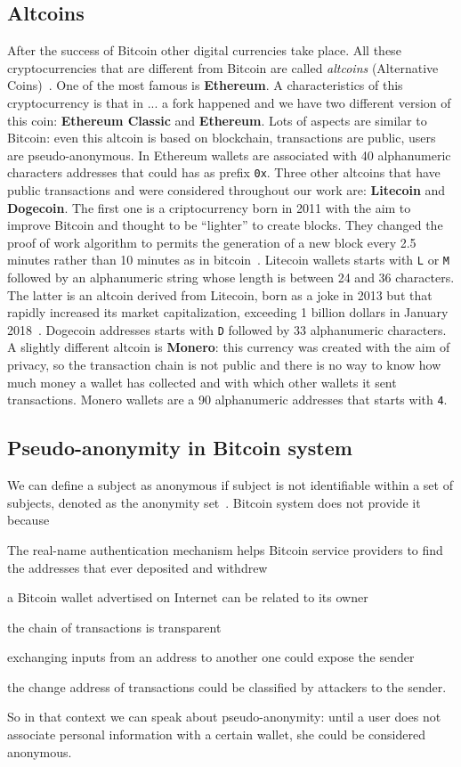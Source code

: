 \subsection{Altcoins}
After the success of Bitcoin other digital currencies take place. All these
cryptocurrencies that are different from Bitcoin are called \textit{altcoins}
(Alternative Coins)~\cite{bitcoinbeyond}. One of the most famous is 
\textbf{Ethereum}. A characteristics of this cryptocurrency is that in ... a
fork happened and we have two different version of this coin: \textbf{Ethereum
Classic} and \textbf{Ethereum}. Lots of aspects are similar to Bitcoin: even
this altcoin is based on blockchain, transactions are public, users are
pseudo-anonymous. In Ethereum wallets are associated with 40 alphanumeric
characters addresses that could has as prefix \texttt{0x}. Three other altcoins
that have public transactions and were considered throughout our work are: 
\textbf{Litecoin} and \textbf{Dogecoin}.
The first one is a criptocurrency
born in 2011 with the aim to improve Bitcoin and thought to be ``lighter''
to create blocks. They changed the proof of work algorithm to permits the
generation of a new block every 2.5 minutes rather than 10 minutes as in
bitcoin~\cite{bib:litecoin:wiki}. 
Litecoin wallets starts with \texttt{L} or \texttt{M} followed by an
alphanumeric string whose length is between 24 and 36 characters.
The latter is an altcoin derived from Litecoin, born as a joke in 2013 but
that rapidly increased its market capitalization, exceeding 1 billion dollars
in January 2018~\cite{}. Dogecoin addresses
starts with \texttt{D} followed by 33 alphanumeric characters.
A slightly different altcoin is \textbf{Monero}: this currency was created with
the aim of privacy, so the transaction chain is not public and there is no
way to know how much money a wallet has collected and with which other wallets
it sent transactions.
Monero wallets are a 90 alphanumeric addresses that starts with \texttt{4}.


\subsection{Pseudo-anonymity in Bitcoin system}
We can define a subject as anonymous if subject is not identifiable within a
set of subjects, denoted as the anonymity set~\cite{terminology}. Bitcoin system
does not provide it because~\cite{deanon}
\begin{enumerate*}[label=\roman*),itemjoin={,\quad}]
\item The real-name authentication mechanism helps Bitcoin service providers to
find the addresses that ever deposited and withdrew
\item a Bitcoin wallet advertised on Internet can be related to its owner
\item the chain of transactions is transparent
\item exchanging inputs from an address to another one could expose the sender
\item the change address of transactions could be classified by attackers to
the sender.
\end{enumerate*}
So in that context we can speak about pseudo-anonymity: until a user does not
associate personal information with a certain wallet, she could be considered
anonymous.
